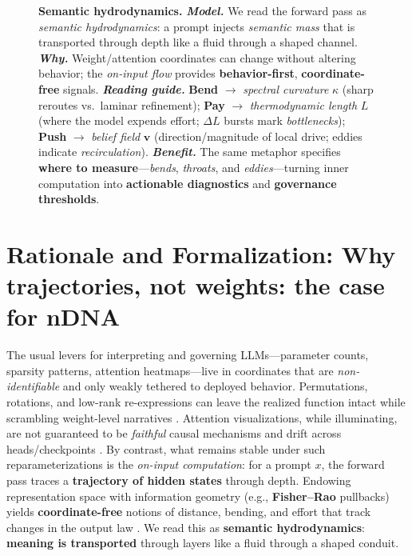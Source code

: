 \documentclass[11pt]{article}
\begin{document}
\begin{figure}[ht!]
  \caption{\textbf{Semantic hydrodynamics.}
  \textbf{\emph{Model.}} We read the forward pass as \emph{semantic hydrodynamics}: a prompt injects \emph{semantic mass} that is transported through depth like a fluid through a shaped channel.
  \textbf{\emph{Why.}} Weight/attention coordinates can change without altering behavior; the \emph{on-input flow} provides \textbf{behavior-first}, \textbf{coordinate-free} signals.
  \textbf{\emph{Reading guide.}} \textbf{Bend} $\to$ \emph{spectral curvature} $\kappa$ (sharp reroutes vs.\ laminar refinement); \textbf{Pay} $\to$ \emph{thermodynamic length} $L$ (where the model expends effort; $\Delta L$ bursts mark \emph{bottlenecks}); \textbf{Push} $\to$ \emph{belief field} $\mathbf{v}$ (direction/magnitude of local drive; eddies indicate \emph{recirculation}).
  \textbf{\emph{Benefit.}} The same metaphor specifies \textbf{where to measure}—\emph{bends}, \emph{throats}, and \emph{eddies}—turning inner computation into \textbf{actionable diagnostics} and \textbf{governance thresholds}.}
  \label{fig:semantic-hydrodynamics-overview}
\end{figure}





\noindent
\section{\textbf{Rationale and Formalization:} Why trajectories, not weights: the case for \textbf{nDNA}}

\noindent
The usual levers for interpreting and governing LLMs---parameter counts, sparsity patterns, attention heatmaps---live in coordinates that are \emph{non-identifiable} and only weakly tethered to deployed behavior.
Permutations, rotations, and low-rank re-expressions can leave the realized function intact while scrambling weight-level narratives \citep{garipov2018loss,draxler2018essentially,li2018visualizing,entezari2022role,ainsworth2023git,wortsman2022model}.
Attention visualizations, while illuminating, are not guaranteed to be \emph{faithful} causal mechanisms and drift across heads/checkpoints \citep{jain2019attention,wiegreffe2019attention,serrano2019attention,clark2019bert,michel2019sixteen,voita2019analyzing}.
By contrast, what remains stable under such reparameterizations is the \emph{on-input computation}: for a prompt $x$, the forward pass traces a \textbf{trajectory of hidden states} through depth.
Endowing representation space with information geometry (e.g., \textbf{Fisher--Rao} pullbacks) yields \textbf{coordinate-free} notions of distance, bending, and effort that track changes in the output law \citep{efron1975defining,amari2000methods,amari2016information}.
We read this as \textbf{semantic hydrodynamics}: \textbf{meaning is transported} through layers like a fluid through a shaped conduit.
\end{document}

